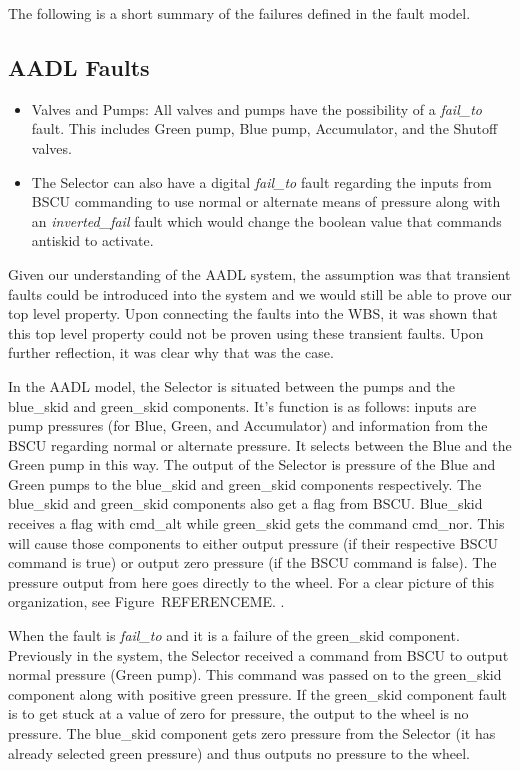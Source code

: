The following is a short summary of the failures defined in the fault model. 

\subsection{AADL Faults}
\begin{itemize}

\item Valves and Pumps: All valves and pumps have the possibility of a \textit{fail\_to} fault. This includes Green pump, Blue pump, Accumulator, and the Shutoff valves. 

\item  The Selector can also have a digital \textit{fail\_to} fault regarding the inputs from BSCU commanding to use normal or alternate means of pressure along with an \textit{inverted\_fail} fault which would change the boolean value that commands antiskid to activate. 

\end{itemize}

Given our understanding of the AADL system, the assumption was that transient faults could be introduced into the system and we would still be able to prove our top level property. Upon connecting the faults into the WBS, it was shown that this top level property could not be proven using these transient faults. Upon further reflection, it was clear why that was the case. 

In the AADL model, the Selector is situated between the pumps and the blue\_skid and green\_skid components. It's function is as follows: inputs are pump pressures (for Blue, Green, and Accumulator) and information from the BSCU regarding normal or alternate pressure. It selects between the Blue and the Green pump in this way. The output of the Selector is pressure of the Blue and Green pumps to the blue\_skid and green\_skid components respectively. The blue\_skid and green\_skid components also get a flag from BSCU. Blue\_skid receives a flag with cmd\_alt while green\_skid gets the command cmd\_nor. This will cause those components to either output pressure (if their respective BSCU command is true) or output zero pressure (if the BSCU command is false). The pressure output from here goes directly to the wheel. For a clear picture of this organization, see Figure~REFERENCEME. .

When the fault is \textit{fail\_to} and it is a failure of the green\_skid component. Previously in the system, the Selector received a command from BSCU to output normal pressure (Green pump). This command was passed on to the green\_skid component along with positive green pressure. If the green\_skid component fault is to get stuck at a value of zero for pressure, the output to the wheel is no pressure. The blue\_skid component gets zero pressure from the Selector (it has already selected green pressure) and thus outputs no pressure to the wheel. 

